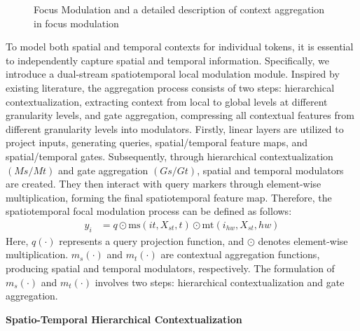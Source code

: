 \documentclass[conference,a4paper,english]{IEEEtran}[2015/08/26]
\begin{document}
\begin{figure}[!b]
  \centering

\caption{Focus Modulation and a detailed description of context aggregation in focus modulation}
\label{fig:two_sub_figures_ieee}
\end{figure}


To model both spatial and temporal contexts for individual tokens,
 it is essential to independently capture spatial and temporal information. Specifically,
  we introduce a dual-stream spatiotemporal local modulation module. Inspired by existing literature, 
  the aggregation process consists of two steps: hierarchical contextualization, 
  extracting context from local to global levels at different granularity levels, 
  and gate aggregation, compressing all contextual features from different granularity levels into 
  modulators. Firstly, linear layers are utilized to project inputs, generating queries, 
  spatial/temporal feature maps, and spatial/temporal gates. Subsequently, through hierarchical
  contextualization \((Ms/Mt)\) and gate aggregation \((Gs/Gt)\), spatial and temporal modulators are created.
  They then interact with query markers through element-wise multiplication, forming the final 
  spatiotemporal feature map.
 Therefore, the spatiotemporal focal modulation process can be defined as follows:
\begin{align*}
  y_i &= q \odot \text{ms}(it, X_{st}, t) \odot \text{mt}(i_{hw}, X_{st}, hw) \tag{9}
  \end{align*}
  Here, \(q(\cdot)\) represents a query projection function, and \(\odot\) denotes 
  element-wise multiplication. \(m_s(\cdot)\) and \(m_t(\cdot)\) are contextual aggregation functions, 
  producing spatial and temporal modulators, respectively. The formulation of \(m_s(\cdot)\) and \(m_t(\cdot)\)
  involves two steps: hierarchical contextualization and gate aggregation.
  



\textbf{Spatio-Temporal Hierarchical Contextualization}
\end{document}
